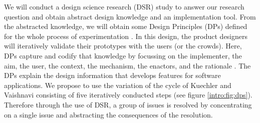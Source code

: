 We will conduct a design science research (DSR) study to answer our research question and obtain abstract design knowledge and an implementation tool. 
From the abstracted knowledge, we will obtain some Design Principles (DPs) defined for the whole process of experimentation \cite{paper:designprinciple:vk}.
In this design, the product designers will iteratively validate their prototypes with the users (or the crowds). 
Here, DPs capture and codify that knowledge by focussing on the implementer, the aim, the user, the context, the mechanism, the enactors, and the rationale \cite{paper:designprinciple:gregor}. 
The DPs explain the design information that develops features for software applications.
We propose to use the variation of the cycle of Kuechler and Vaishnavi \cite{paper:designprinciple:vk} consisting of five iteratively conducted steps (see figure \ref{intro:fig:dps}). 
Therefore through the use of DSR, a group of issues is resolved by concentrating on a single issue and abstracting the consequences of the resolution.

